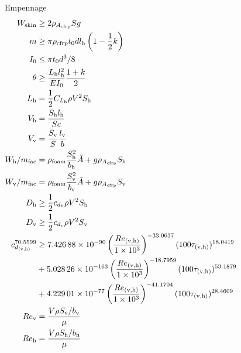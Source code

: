 \documentclass{beamer}
\begin{document}
\begin{frame}
\begin{columns}
\begin{itemize}
{{    \item Empennage
        \begin{align*}
            W_{\text{skin}} & \geq 2 \rho_{A_{\text{cfrp}}} S g \\
            m &\geq \pi \rho_{\text{cfrp}} t_0 d l_{\text{h}} \left( 1 - \frac{1}{2} k\right) \\
            I_0 &\leq \pi t_0 d^3/8 \\
            \theta &\geq \frac{L_{\text{h}} l_{\text{h}}^2}{EI_0} \frac{1+k}{2} \\
            L_{\text{h}} &= \frac{1}{2} C_{L_{\text{h}}} \rho V^2 S_{\text{h}} \\
            V_{\text{h}} &= \frac{S_{\text{h}}l_{\text{h}}}{Sc} \\
            V_{\text{v}} &= \frac{S_{\text{v}}}{S} \frac{l_{\text{v}}}{b} \\
            W_{\text{h}}/m_{\text{fac}} &= \rho_{\text{foam}} \frac{S_{\text{h}}^2}{b_{\text{h}}} \bar{A} + g\rho_{A_{\text{cfrp}}} S_{\text{h}} \\
            W_{\text{v}}/m_{\text{fac}} &= \rho_{\text{foam}} \frac{S_{\text{v}}^2}{b_{\text{v}}} \bar{A} + g\rho_{A_{\text{cfrp}}} S_{\text{v}} \\
            D_{\text{h}} &\geq \frac{1}{2} c_{d_{\text{h}}} \rho V^2 S_{\text{h}} \\
            D_{\text{v}} &\geq \frac{1}{2} c_{d_{\text{v}}} \rho V^2 S_{\text{v}} \\
            c_{d_{\text{(v,h)}}}^{70.5599} &\geq \num{7.42688d-90} \left( \frac{Re_{\text{(v,h)}}}{\num{1d3}} \right)^{-33.0637}(100 \tau_{\text{(v,h)}})^{18.0419}  \nonumber \\
                         & + \num{5.02826d-163}\left(\frac{Re_{\text{(v,h)}}}{\num{1d3}}\right)^{-18.7959} (100\tau_{\text{(v,h)}})^{53.1879} \\
                         &+ \num{4.22901d-77}\left(\frac{Re_{\text{(v,h)}}}{\num{1d3}}\right)^{-41.1704} (100\tau_{\text{(v,h)}})^{28.4609} \nonumber \\
            Re_{\text{v}} &= \frac{V\rho S_{\text{v}}/b_{\text{v}}}{\mu} \\
            Re_{\text{h}} &= \frac{V\rho S_{\text{h}}/b_{\text{h}}}{\mu} 
        \end{align*}

}}
        \end{itemize}

\end{columns}

\end{frame}
\end{document}

